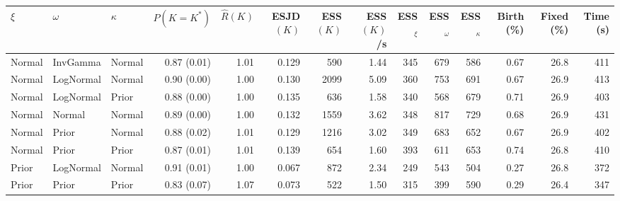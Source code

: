 
\begin{tabular}{l l l r r r r r r r r r r r}
  \toprule
  $\xi$ & $\omega$ & $\kappa$ & $P(K{=}K^*)$ & $\hat{R}(K)$ & ESJD$(K)$ & ESS$(K)$ & ESS$(K)$/s & ESS$_\xi$ & ESS$_\omega$ & ESS$_\kappa$ & Birth (\%) & Fixed (\%) & Time (s) \\
  \midrule
  Normal & InvGamma & Normal & 0.87 (0.01) & 1.01 & 0.129 & 590 & 1.44 & 345 & 679 & 586 & 0.67 & 26.8 & 411 \\
  Normal & LogNormal & Normal & 0.90 (0.00) & 1.00 & 0.130 & 2099 & 5.09 & 360 & 753 & 691 & 0.67 & 26.9 & 413 \\
  Normal & LogNormal & Prior & 0.88 (0.00) & 1.00 & 0.135 & 636 & 1.58 & 340 & 568 & 679 & 0.71 & 26.9 & 403 \\
  Normal & Normal & Normal & 0.89 (0.00) & 1.00 & 0.132 & 1559 & 3.62 & 348 & 817 & 729 & 0.68 & 26.9 & 431 \\
  Normal & Prior & Normal & 0.88 (0.02) & 1.01 & 0.129 & 1216 & 3.02 & 349 & 683 & 652 & 0.67 & 26.9 & 402 \\
  Normal & Prior & Prior & 0.87 (0.01) & 1.01 & 0.139 & 654 & 1.60 & 393 & 611 & 653 & 0.74 & 26.8 & 410 \\
  Prior & LogNormal & Normal & 0.91 (0.01) & 1.00 & 0.067 & 872 & 2.34 & 249 & 543 & 504 & 0.27 & 26.8 & 372 \\
  Prior & Prior & Prior & 0.83 (0.07) & 1.07 & 0.073 & 522 & 1.50 & 315 & 399 & 590 & 0.29 & 26.4 & 347 \\
  \bottomrule
\end{tabular}
